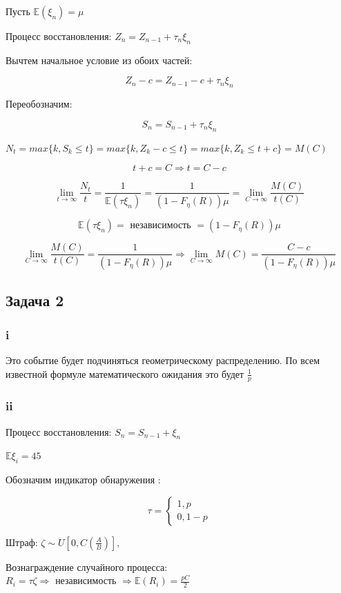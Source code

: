 \documentclass[a4paper,12pt]{article}
\def \mbb{\mathbb}
\def \E{\mbb{E}}
\begin{document}
Пусть $ \E(\xi_n) = \mu $

Процесс восстановления: $ Z_n = Z_{n-1} + \tau_n \xi_n $

Вычтем начальное условие из обоих частей:

\[ Z_n - c = Z_{n-1} - c + \tau_n \xi_n \]

Переобозначим:

\[  S_n = S_{n-1} + \tau_n \xi_n  \]

$ N_t = max\{ k, S_k \le t \} = max\{ k, Z_k - c \le t \} = max\{ k, Z_k \le t + c\} = M(C) $

\[ t + c = C \Rightarrow t = C - c  \]

\[ \lim\limits_{t \to \infty} \frac{N_t}{t} = \frac{1}{\E(\tau \xi_n)} = \frac{1}{(1 - F_\eta(R))\mu} = \lim\limits_{C \to \infty} \frac{M(C)}{t(C)} \]

\[ \E(\tau \xi_n) = \text{ независимость } = (1 - F_\eta(R)) \mu \]


\[ \lim\limits_{C \to \infty} \frac{M(C)}{t(C)} =  \frac{1}{(1 - F_\eta(R))\mu} \Rightarrow  \lim\limits_{C \to \infty} M(C) = \frac{C - c}{(1 - F_\eta(R))\mu} \]

\subsection{Задача 2} 

\subsubsection{i}
 
 Это событие будет подчиняться геометрическому распределению. По всем известной формуле математического ожидания это будет $ \frac{1}{p} $

\subsubsection{ii}

Процесс восстановления: $ S_n = S_{n-1} + \xi_n $

$ \E \xi_i = 45 $

Обозначим индикатор обнаружения :

\[\tau = \begin{cases}
1,  p\\
0, 1-p
\end{cases}  \]

Штраф: $ \zeta \sim U[0, C(\frac{A}{B})],  $

Вознаграждение случайного процесса:  $ R_i = \tau \zeta  \Rightarrow \text{ независимость } \Rightarrow \E(R_i) = \frac{p C}{2}$
\end{document}
